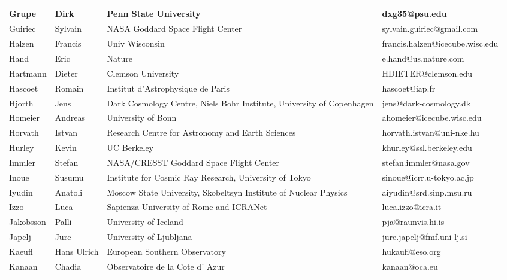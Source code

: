 \begin{center}
\begin{longtable}{|p{1.28cm} |p{1.28cm} |p{2.9cm} |p{3cm} |}
\tiny Grupe &\tiny Dirk & \tiny Penn State University & \tiny dxg35@psu.edu \\ \hline
\tiny Guiriec &\tiny Sylvain & \tiny NASA Goddard Space Flight Center & \tiny sylvain.guiriec@gmail.com \\ \hline
\tiny Halzen &\tiny Francis & \tiny Univ Wisconsin & \tiny francis.halzen@icecube.wisc.edu \\ \hline
\tiny Hand &\tiny Eric & \tiny Nature & \tiny e.hand@us.nature.com \\ \hline
\tiny Hartmann &\tiny Dieter & \tiny Clemson University & \tiny HDIETER@clemson.edu \\ \hline
\tiny Hascoet &\tiny Romain & \tiny Institut d'Astrophysique de Paris & \tiny hascoet@iap.fr \\ \hline
\tiny Hjorth &\tiny Jens & \tiny Dark Cosmology Centre, Niels Bohr Institute, University of Copenhagen & \tiny jens@dark-cosmology.dk \\ \hline
\tiny Homeier &\tiny Andreas & \tiny University of Bonn & \tiny ahomeier@icecube.wisc.edu \\ \hline
\tiny Horvath &\tiny Istvan & \tiny Research Centre for Astronomy and Earth Sciences & \tiny horvath.istvan@uni-nke.hu \\ \hline
\tiny Hurley &\tiny Kevin & \tiny UC Berkeley & \tiny khurley@ssl.berkeley.edu \\ \hline
\tiny Immler &\tiny Stefan & \tiny NASA/CRESST Goddard Space Flight Center & \tiny stefan.immler@nasa.gov \\ \hline
\tiny Inoue &\tiny Susumu & \tiny Institute for Cosmic Ray Research, University of Tokyo & \tiny sinoue@icrr.u-tokyo.ac.jp \\ \hline
\tiny Iyudin &\tiny Anatoli & \tiny Moscow State University, Skobeltsyn Institute of Nuclear Physics & \tiny aiyudin@srd.sinp.msu.ru \\ \hline
\tiny Izzo &\tiny Luca & \tiny Sapienza University of Rome and ICRANet & \tiny luca.izzo@icra.it \\ \hline
\tiny Jakobsson &\tiny Palli & \tiny University of Iceland & \tiny pja@raunvis.hi.is \\ \hline
\tiny Japelj &\tiny Jure & \tiny University of Ljubljana & \tiny jure.japelj@fmf.uni-lj.si \\ \hline
\tiny Kaeufl &\tiny Hans Ulrich & \tiny European Southern Observatory & \tiny hukaufl@eso.org \\ \hline
\tiny Kanaan &\tiny Chadia & \tiny Observatoire de la Cote d' Azur & \tiny kanaan@oca.eu \\ \hline

\end{longtable}
\end{center}
